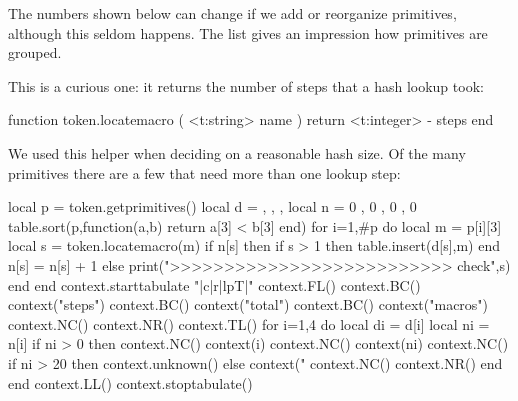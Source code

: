 The numbers shown below can change if we add or reorganize primitives, although
this seldom happens. The list gives an impression how primitives are grouped.

\showengineprimitives[2]

This is a curious one: it returns the number of steps that a hash lookup took:

\starttyping[option=LUA]
function token.locatemacro ( <t:string> name )
    return <t:integer> - steps
end
\stoptyping

We used this helper when deciding on a reasonable hash size. Of the many
primitives there are a few that need more than one lookup step:

\startluacode
local p = token.getprimitives()
local d = { { }, { }, { }, { } }
local n = {  0 ,  0 ,  0 ,  0  }
table.sort(p,function(a,b) return a[3] < b[3] end)
for i=1,#p do
    local m = p[i][3]
    local s = token.locatemacro(m)
    if n[s] then
        if s > 1 then
            table.insert(d[s],m)
        end
        n[s] = n[s] + 1
    else
        print(">>>>>>>>>>>>>>>>>>>>>>>>>> check",s)
    end
end
context.starttabulate { "|c|r|lpT|" }
context.FL()
context.BC() context("steps")
context.BC() context("total")
context.BC() context("macros")
context.NC() context.NR()
context.TL()
for i=1,4 do
    local di = d[i]
    local ni = n[i]
    if ni > 0 then
        context.NC() context(i)
        context.NC() context(ni)
        context.NC() if ni > 20 then context.unknown() else context("%
        context.NC() context.NR()
    end
end
context.LL()
context.stoptabulate()
\stopluacode

\stopsubsection

\stopsection

\stopdocument


